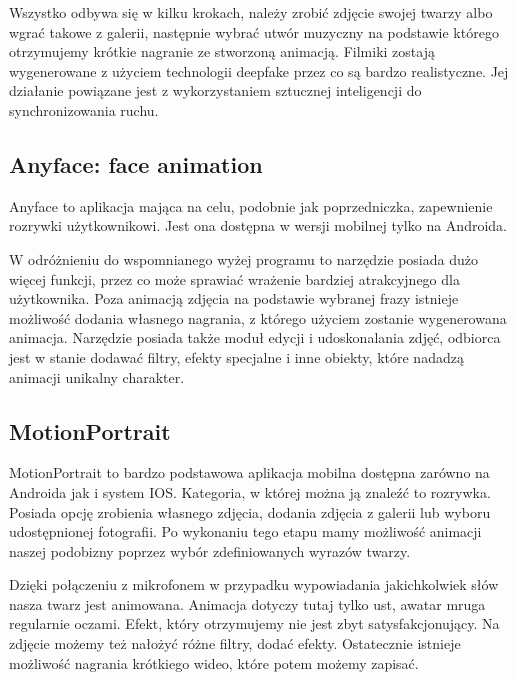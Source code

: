 Wszystko odbywa się w kilku krokach, należy zrobić zdjęcie swojej twarzy albo wgrać takowe z galerii, następnie wybrać utwór muzyczny na podstawie którego otrzymujemy krótkie nagranie ze stworzoną animacją. Filmiki zostają wygenerowane z użyciem technologii deepfake przez co są bardzo realistyczne. Jej działanie powiązane jest z wykorzystaniem sztucznej inteligencji do synchronizowania ruchu.


\subsection{Anyface: face animation}
Anyface \cite{anyface} to aplikacja mająca na celu, podobnie jak poprzedniczka, zapewnienie rozrywki użytkownikowi. Jest ona dostępna w wersji mobilnej tylko na Androida.

W odróżnieniu do wspomnianego wyżej programu to narzędzie posiada dużo więcej funkcji, przez co może sprawiać wrażenie bardziej atrakcyjnego dla użytkownika. Poza animacją zdjęcia na podstawie wybranej frazy istnieje możliwość dodania własnego nagrania, z którego użyciem zostanie wygenerowana animacja. Narzędzie posiada także moduł edycji i udoskonalania zdjęć, odbiorca jest w stanie dodawać filtry, efekty specjalne i inne obiekty, które nadadzą animacji unikalny charakter. 


\subsection{MotionPortrait}
MotionPortrait \cite{motionportrait} to bardzo podstawowa aplikacja mobilna dostępna zarówno na Androida jak i system IOS. Kategoria, w której można ją znaleźć to rozrywka. Posiada opcję zrobienia własnego zdjęcia, dodania zdjęcia z galerii lub wyboru udostępnionej fotografii. Po wykonaniu tego etapu mamy możliwość animacji naszej podobizny poprzez wybór zdefiniowanych wyrazów twarzy. 

Dzięki połączeniu z mikrofonem w przypadku wypowiadania jakichkolwiek słów nasza twarz jest animowana. Animacja dotyczy tutaj tylko ust, awatar mruga regularnie oczami. Efekt, który otrzymujemy nie jest zbyt satysfakcjonujący. Na zdjęcie możemy też nałożyć różne filtry, dodać efekty. Ostatecznie istnieje możliwość nagrania krótkiego wideo, które potem możemy zapisać.

